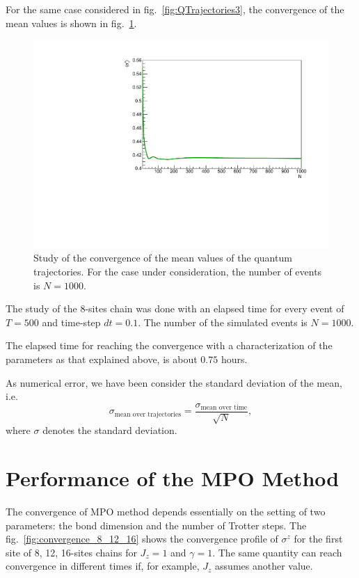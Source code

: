 For the same case considered in fig.~\ref{fig:QTrajectories3}, the convergence of the mean values is shown in fig.~\ref{fig:Convergence_s8J1051}. 

\begin{figure}[H]
    \centering
    \includegraphics[scale=0.6]{Figures/Convergence_s8J1051.pdf}
    \captionsetup{width=1.\linewidth}
    \caption{Study of the convergence of the mean values of the quantum trajectories. For the case under consideration, the number of events is $N = 1000$.}
    \label{fig:Convergence_s8J1051}
\end{figure}

The study of the 8-sites chain was done with an elapsed time for every event of $T = 500$ and time-step $dt = 0.1$. The number of the simulated events is $N = 1000$.

The elapsed time for reaching the convergence with a characterization of the parameters as that explained above, is about $0.75$ hours. 

As numerical error, we have been consider the standard deviation of the mean, i.e.
\begin{equation*}
    \sigma_{\text{mean over trajectories}} = \frac{\sigma_\text{mean over time}}{\sqrt{N}},
\end{equation*}
where $\sigma$ denotes the standard deviation.


\section{Performance of the MPO Method}
\label{sec:MPO_errors}
The convergence of MPO method depends essentially on the setting of two parameters: the bond dimension and the number of Trotter steps. The fig.~\ref{fig:convergence_8_12_16} shows the convergence profile of $\sigma^z$ for the first site of 8, 12, 16-sites chains for $J_z = 1$ and $\gamma = 1$. The same quantity can reach convergence in different times if, for example, $J_z$ assumes another value. 

